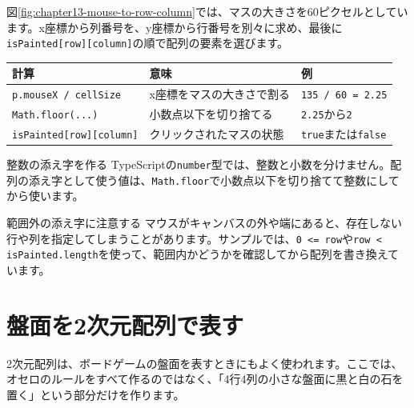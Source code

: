 図\ref{fig:chapter13-mouse-to-row-column}では、マスの大きさを60ピクセルとしています。x座標から列番号を、y座標から行番号を別々に求め、最後に\texttt{isPainted[row][column]}の順で配列の要素を選びます。

\begin{center}
\begin{tabular}{lll}
\toprule
計算 & 意味 & 例 \\
\midrule
\texttt{p.mouseX / cellSize} & x座標をマスの大きさで割る & \texttt{135 / 60 = 2.25} \\
\texttt{Math.floor(...)} & 小数点以下を切り捨てる & \texttt{2.25}から\texttt{2} \\
\texttt{isPainted[row][column]} & クリックされたマスの状態 & \texttt{true}または\texttt{false} \\
\bottomrule
\end{tabular}
\end{center}

\begin{notebox}{整数の添え字を作る}
TypeScriptの\texttt{number}型では、整数と小数を分けません。配列の添え字として使う値は、\texttt{Math.floor}で小数点以下を切り捨てて整数にしてから使います。
\end{notebox}

\begin{mistakebox}{範囲外の添え字に注意する}
マウスがキャンバスの外や端にあると、存在しない行や列を指定してしまうことがあります。サンプルでは、\texttt{0 <= row}や\texttt{row < isPainted.length}を使って、範囲内かどうかを確認してから配列を書き換えています。
\end{mistakebox}

\section{盤面を2次元配列で表す}

2次元配列は、ボードゲームの盤面を表すときにもよく使われます。ここでは、オセロのルールをすべて作るのではなく、「4行4列の小さな盤面に黒と白の石を置く」という部分だけを作ります。

\begin{listing}[htbp]
\inputminted[firstline=1,lastline=45]{ts}{typescript-p5/listings/chapter13/simple-board.ts}
\caption{\texttt{number[][]}で簡単な盤面を表す前半（\texttt{chapter13/simple-board.ts}）}
\label{lst:chapter13-simple-board-draw}
\end{listing}

\begin{listing}[htbp]
\inputminted[firstline=47,lastline=67]{ts}{typescript-p5/listings/chapter13/simple-board.ts}
\caption{\texttt{number[][]}で簡単な盤面を表す後半（\texttt{chapter13/simple-board.ts}）}
\label{lst:chapter13-simple-board-click}
\end{listing}

